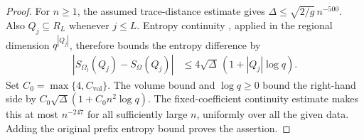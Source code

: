 \begin{proof}
    \leanok
    For $n\ge1$, the assumed trace-distance estimate gives
    $\Delta\le\sqrt{2/g}\,n^{-500}$. Also $Q_j\subseteq R_L$ whenever
    $j\le L$. Entropy continuity
    \cite[Lemma~2.1]{OpenAI2026AreaLaw}, applied in the regional dimension
    $q^{|Q_j|}$, therefore bounds the entropy difference by
    \begin{align}
        |S_{\Omega_t}(Q_j)-S_\Omega(Q_j)|
         & \le4\sqrt{\Delta}\,(1+|Q_j|\log q).
    \end{align}
    Set $C_0=\max\{4,C_{\mathrm{vol}}\}$. The volume bound and
    $\log q\ge0$ bound the right-hand side by
    $C_0\sqrt{\Delta}(1+C_0n^2\log q)$. The fixed-coefficient
    continuity estimate makes this at most $n^{-247}$ for all
    sufficiently large $n$, uniformly over all the given data.
    Adding the original prefix entropy bound proves the assertion.
\end{proof}
